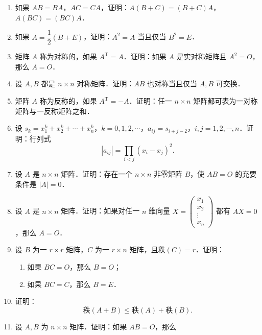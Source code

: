 \begin{enumerate}
  \begin{enumerate}
    \item 如果 $AE_{12}=E_{12}A$，那么当 $k\neq1$ 时 $a_{k1}=0$，当 $k\neq2$ 时 $a_{2k}=0$；
  \anssub
    \item 如果 $AE_{ij}=E_{ij}A$，那么当 $k\neq i$ 时 $a_{ki}=0$，当 $k\neq j$ 时 $a_{jk}=0$，且 $a_{ii}=a_{jj}$；
  \anssub
    \item 如果 $A$ 与所有的 $n$ 阶矩阵可交换，那么 $A$ 一定是数量矩阵，即 $A=aE$．
  \anssub
  \end{enumerate}
  \item 如果 $AB=BA$，$AC=CA$，证明：$A(B+C)=(B+C)A$，$A(BC)=(BC)A$．
  \ansproof
  \item 如果 $A=\dfrac{1}{2}(B+E)$，证明：$A^2=A$ 当且仅当 $B^2=E$．
  \ansproof
  \item 矩阵 $A$ 称为对称的，如果 $A^{\mathrm{T}}=A$．证明：如果 $A$ 是实对称矩阵且 $A^2=O$，那么 $A=O$．
  \ansproof
  \item 设 $A,B$ 都是 $n\times n$ 对称矩阵．证明：$AB$ 也对称当且仅当 $A,B$ 可交换．
  \ansproof
  \item 矩阵 $A$ 称为反称的，如果 $A^{\mathrm{T}}=-A$．证明：任一 $n\times n$ 矩阵都可表为一对称矩阵与一反称矩阵之和．
  \ansproof
  \item 设 $s_k=x_1^k+x_2^k+\cdots+x_n^k$，$k=0,1,2,\cdots$，$a_{ij}=s_{i+j-2}$，$i,j=1,2,\cdots,n$．证明：行列式
  \[
    |a_{ij}|=\prod_{i<j}(x_i-x_j)^2.
  \]
  \ansproof
  \item 设 $A$ 是 $n\times n$ 矩阵．证明：存在一个 $n\times n$ 非零矩阵 $B$，使 $AB=O$ 的充要条件是 $|A|=0$．
  \ansproof
  \item 设 $A$ 是 $n\times n$ 矩阵．证明：如果对任一 $n$ 维向量 $X=\begin{pmatrix}x_1\\x_2\\\vdots\\x_n\end{pmatrix}$ 都有 $AX=0$，那么 $A=O$．
  \ansproof
  \item 设 $B$ 为一 $r\times r$ 矩阵，$C$ 为一 $r\times n$ 矩阵，且秩$(C)=r$．证明：
  \begin{enumerate}
    \item 如果 $BC=O$，那么 $B=O$；
  \anssub
    \item 如果 $BC=C$，那么 $B=E$．
  \anssub
  \end{enumerate}
  \item 证明：
  \[
    \text{秩}(A+B)\leqslant\text{秩}(A)+\text{秩}(B).
  \]
  \ansproof
  \item 设 $A,B$ 为 $n\times n$ 矩阵．证明：如果 $AB=O$，那么

\end{enumerate}
